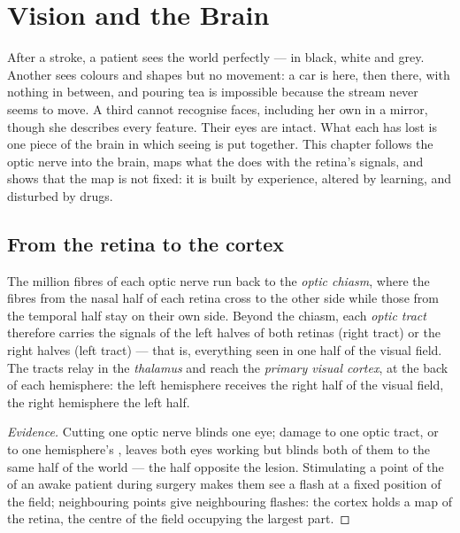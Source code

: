 \chapter{Vision and the Brain}\label{ch:g11:vision-and-brain}

After a stroke, a patient sees the world perfectly --- in black, white
and grey. Another sees colours and shapes but no movement: a car is
here, then there, with nothing in between, and pouring tea is
impossible because the stream never seems to move. A third cannot
recognise faces, including her own in a mirror, though she describes
every feature. Their eyes are intact. What each has lost is one
piece of the brain in which seeing is put together. This chapter
follows the optic nerve into the brain, maps what the 
does with the retina's signals, and shows that the map is not fixed:
it is built by experience, altered by learning, and disturbed by
drugs.

\section{From the retina to the cortex}

\begin{proposition}\label{prop:g11:vision-and-brain:pathway}
The million fibres of each optic nerve run back to the \emph{optic
chiasm}, where the fibres from the nasal half of each retina cross to
the other side while those from the temporal half stay on their own
side. Beyond the chiasm, each \emph{optic tract} therefore carries the
signals of the left halves of both retinas (right tract) or the right
halves (left tract) --- that is, everything seen in one half of the
visual field. The tracts relay in the \emph{thalamus} and reach the
\emph{primary visual cortex}, at the back of
each hemisphere: the left hemisphere receives the right half of the
visual field, the right hemisphere the left half.
\end{proposition}
\begin{proof}[Evidence]
Cutting one optic nerve blinds one eye; damage to one optic tract, or
to one hemisphere's , leaves both eyes working but blinds
both of them to the same half of the world --- the half opposite the
lesion. Stimulating a point of the  of an awake patient
during surgery makes them see a flash at a fixed position of the
field; neighbouring points give neighbouring flashes: the cortex holds
a map of the retina, the centre of the field occupying the largest
part.
\end{proof}

